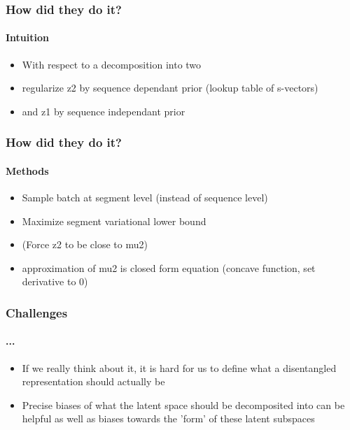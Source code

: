 \documentclass[9pt]{beamer}
\begin{document}
\begin{frame}
\frametitle{How did they do it?}
\framesubtitle{Intuition}
\begin{itemize}%
	\item With respect to a decomposition into two
	\item regularize z2 by sequence dependant prior (lookup table of s-vectors)
	\item and z1 by sequence independant prior
\end{itemize}
\end{frame} 





\begin{frame}
\frametitle{How did they do it?}
\framesubtitle{Methods}
\begin{itemize}%
	\item Sample batch at segment level (instead of sequence level)
	\item Maximize segment variational lower bound
	\item (Force z2 to be close to mu2)
	\item approximation of mu2 is closed form equation (concave function, set derivative to 0)
\end{itemize}
\end{frame} 



\begin{frame}
\frametitle{Challenges}
\framesubtitle{...}
\begin{itemize}%
	\item If we really think about it, it is hard for us to define what a disentangled representation should actually be
	\item Precise biases of what the latent space should be decomposited into can be helpful as well as biases towards the 'form' of these latent subspaces
\end{itemize}
\end{frame} 
\end{document}
